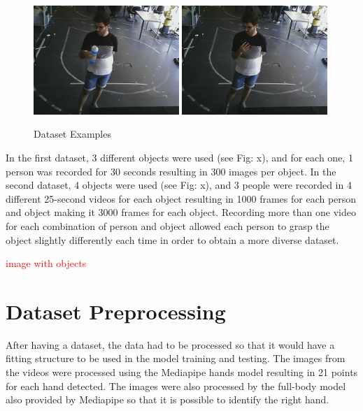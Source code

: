 \begin{figure}[H]
\centerline{\includegraphics[width=0.49\textwidth]{figs/dataset_preprocessing1_1.png} \includegraphics[width=0.49\textwidth]{figs/dataset_preprocessing1_2.png}}
\caption[Dataset Examples]{Dataset Examples}
\label{fig:dataset_examples}
\end{figure}

In the first dataset, 3 different objects were used (see Fig: x), and for each one, 1 person was recorded for 30 seconds resulting in 300 images per object. In the second dataset, 4 objects were used (see Fig: x), and 3 people were recorded in 4 different 25-second videos for each object resulting in 1000 frames for each person and object making it 3000 frames for each object. Recording more than one video for each combination of person and object allowed each person to grasp the object slightly differently each time in order to obtain a more diverse dataset.

\textcolor{red}{image with objects}

\section{Dataset Preprocessing}

After having a dataset, the data had to be processed so that it would have a fitting structure to be used in the model training and testing. The images from the videos were processed using the Mediapipe hands model resulting in 21 points for each hand detected. The images were also processed by the full-body model also provided by Mediapipe so that it is possible to identify the right hand.

